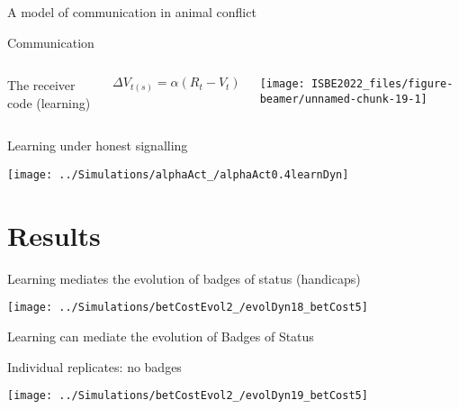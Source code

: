 \documentclass[
  ignorenonframetext,
  aspectratio=169]{beamer}
\begin{document}
\begin{frame}{A model of communication in animal conflict}
\begin{block}{Communication}
\begin{columns}[T]

The receiver code (learning)

\tiny
\begin{equation*}
  \Delta V_{t(s)}=\alpha (R_t-V_t)
\end{equation*}



\begin{center}\texttt{[image: ISBE2022\_files/figure-beamer/unnamed-chunk-19-1]} \end{center}

\end{columns}
\end{block}
\end{frame}

\begin{frame}{Learning under honest signalling}
\protect\hypertarget{learning-under-honest-signalling}{}
\begin{center}\texttt{[image: ../Simulations/alphaAct\_/alphaAct0.4learnDyn]} \end{center}
\end{frame}

\hypertarget{results}{%
\section{Results}\label{results}}

\begin{frame}{Learning mediates the evolution of badges of status
(handicaps)}
\protect\hypertarget{learning-mediates-the-evolution-of-badges-of-status-handicaps}{}
\begin{center}\texttt{[image: ../Simulations/betCostEvol2\_/evolDyn18\_betCost5]} \end{center}
\end{frame}

\begin{frame}{Learning can mediate the evolution of Badges of Status}
\protect\hypertarget{learning-can-mediate-the-evolution-of-badges-of-status}{}
\begin{block}{Individual replicates: no badges}
\protect\hypertarget{individual-replicates-no-badges}{}
\begin{center}\texttt{[image: ../Simulations/betCostEvol2\_/evolDyn19\_betCost5]} \end{center}
\end{block}
\end{frame}
\end{document}
